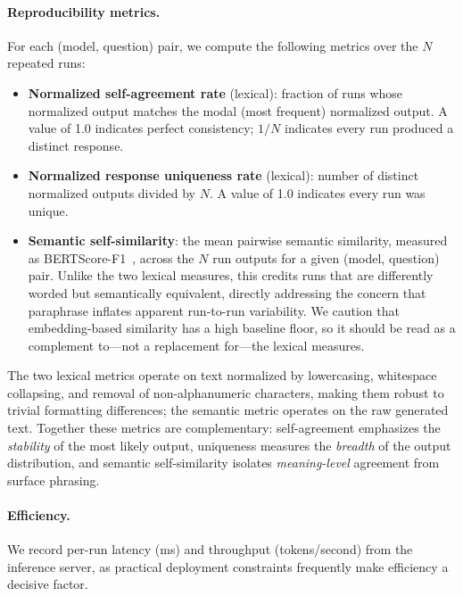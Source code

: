\documentclass[10pt,letterpaper]{article}
\begin{document}
\paragraph{Reproducibility metrics.}
For each (model, question) pair, we compute the following metrics over
the $N$ repeated runs:

\begin{itemize}
  \item \textbf{Normalized self-agreement rate} (lexical): fraction of
        runs whose normalized output matches the modal (most frequent)
        normalized output.
        A value of 1.0 indicates perfect consistency; $1/N$ indicates
        every run produced a distinct response.
  \item \textbf{Normalized response uniqueness rate} (lexical): number
        of distinct normalized outputs divided by $N$.
        A value of 1.0 indicates every run was unique.
  \item \textbf{Semantic self-similarity}: the mean pairwise
        semantic similarity, measured as BERTScore-F1~\cite{zhang2020bertscore},
        across the $N$ run outputs for a given (model, question) pair.
        Unlike the two lexical measures, this credits runs that are
        differently worded but semantically equivalent, directly
        addressing the concern that paraphrase inflates apparent
        run-to-run variability. We caution that embedding-based
        similarity has a high baseline floor, so it should be read as a
        complement to---not a replacement for---the lexical measures.
\end{itemize}

The two lexical metrics operate on text normalized by lowercasing,
whitespace collapsing, and removal of non-alphanumeric characters,
making them robust to trivial formatting differences; the semantic
metric operates on the raw generated text.
Together these metrics are complementary: self-agreement emphasizes
the \emph{stability} of the most likely output, uniqueness
measures the \emph{breadth} of the output distribution, and semantic
self-similarity isolates \emph{meaning-level} agreement from surface
phrasing.

\paragraph{Efficiency.}
We record per-run latency (ms) and throughput (tokens/second)
from the inference server, as practical deployment constraints
frequently make efficiency a decisive factor.
\end{document}
